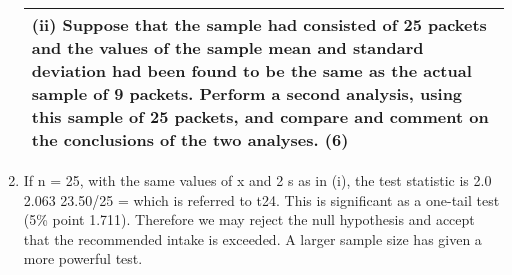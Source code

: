 \documentclass[a4paper,12pt]{article}
\begin{document}
\begin{enumerate}
\newpage
\begin{table}[ht!]
 
\centering
 
\begin{tabular}{|p{15cm}|}
 
\hline  

(ii) Suppose that the sample had consisted of 25 packets and the values of the sample mean and standard deviation had been found to be the same as the actual sample of 9 packets.  Perform a second analysis, using this sample of 25 packets, and compare and comment on the conclusions of the two analyses. (6) 

\\ \hline
  
\end{tabular}

\end{table}





 
\item  If n = 25, with the same values of x and 2 s as in (i), the test statistic is 2.0 2.063 23.50/25 = which is referred to t24.  This is significant as a one-tail test (5\% point 1.711).  Therefore we may reject the null hypothesis and accept that the recommended intake is exceeded.  A larger sample size has given a more powerful test. \end{enumerate}
\end{document}
